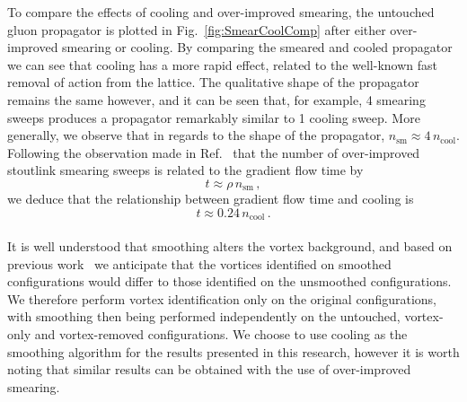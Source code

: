 To compare the effects of cooling and over-improved smearing, the untouched gluon propagator is plotted in Fig.~\ref{fig:SmearCoolComp} after either over-improved smearing or cooling. By comparing the smeared and cooled propagator we can see that cooling has a more rapid effect, related to the well-known fast removal of action from the lattice. The qualitative shape of the propagator remains the same however, and it can be seen that, for example, 4 smearing sweeps produces a propagator remarkably similar to 1 cooling sweep. More generally, we observe that in regards to the shape of the propagator, $n_{\text{sm}}\approx4\,n_{\text{cool}}$. Following the observation made in Ref.~\cite{Thomas:2014tda} that the number of over-improved stoutlink smearing sweeps is related to the gradient flow time by
%
\begin{equation}
t\approx\rho\,n_{\text{sm}}\, ,
\end{equation}
%
we deduce that the relationship between gradient flow time and cooling is
\begin{equation}
t\approx0.24\,n_{\text{cool}}\,.
\end{equation}\\

It is well understood that smoothing alters the vortex background, and based on previous work~\cite{Cais:2008za,Trewartha:2015ida,DelDebbio:1998luz} we anticipate that the vortices identified on smoothed configurations would differ to those identified on the unsmoothed configurations. We therefore perform vortex identification only on the original configurations, with smoothing then being performed independently on the untouched, vortex-only and vortex-removed configurations. We choose to use cooling as the smoothing algorithm for the results presented in this research, however it is worth noting that similar results can be obtained with the use of over-improved smearing. 

